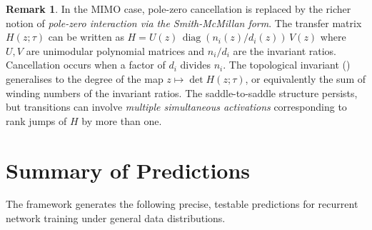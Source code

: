 \documentclass[11pt,a4paper]{article}
\theoremstyle{definition}
\newtheorem{remark}[theorem]{Remark}
\DeclareMathOperator{\diag}{diag}
\begin{document}
\begin{remark}
In the MIMO case, pole-zero cancellation is replaced by the
richer notion of \emph{pole-zero interaction via the Smith-McMillan
form}. The transfer matrix $H(z;\tau)$ can be written as
$H = U(z)\, \diag(n_i(z)/d_i(z))\, V(z)$ where $U, V$ are
unimodular polynomial matrices and $n_i/d_i$ are the invariant
ratios. Cancellation occurs when a factor of $d_i$ divides $n_i$.
The topological invariant
() generalises to the degree of the map
$z \mapsto \det H(z;\tau)$, or equivalently the sum of winding
numbers of the invariant ratios. The saddle-to-saddle structure
persists, but transitions can involve \emph{multiple simultaneous
activations} corresponding to rank jumps of $H$ by more than one.
\end{remark}

\section{Summary of Predictions}\label{sec:predictions}

\noindent
The framework generates the following precise, testable
predictions for recurrent network training under general data
distributions.
\end{document}
